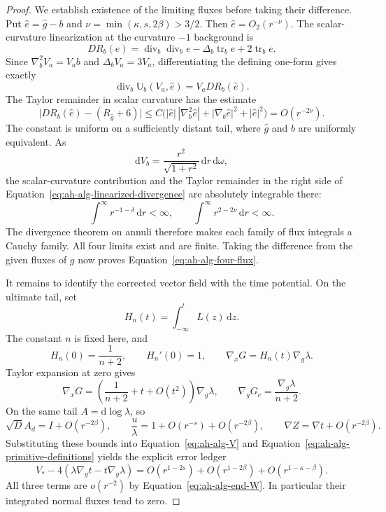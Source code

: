 \begin{proof}
We establish existence of the limiting fluxes before taking their
difference.  Put \(\widehat e=\widehat g-b\) and
\(\nu=\min(\kappa,s,2\beta)>3/2\).  Then
\(\widehat e=O_2(r^{-\nu})\).  The scalar-curvature linearization at
the curvature \(-1\) background is
\[
 D R_b(e)=\operatorname{div}_b\operatorname{div}_b e
           -\Delta_b\operatorname{tr}_b e+2\operatorname{tr}_b e.
\]
Since \(\nabla_b^2V_a=V_a b\) and \(\Delta_bV_a=3V_a\),
differentiating the defining one-form gives exactly
\begin{equation}
 \operatorname{div}_b\mathbb U_b(V_a,\widehat e)
                   =V_a D R_b(\widehat e).
 \label{eq:ah-alg-linearized-divergence}
\end{equation}
The Taylor remainder in scalar curvature has the estimate
\[
 \bigl|D R_b(\widehat e)-(R_{\widehat g}+6)\bigr|
 \le C\bigl(
       |\widehat e|\,|\nabla_b^2\widehat e|
       +|\nabla_b\widehat e|^2+|\widehat e|^2
       \bigr)
 =O(r^{-2\nu}).
\]
The constant is uniform on a sufficiently distant tail, where
\(\widehat g\) and \(b\) are uniformly equivalent.  As
\[
 \mathrm dV_b=\frac{r^2}{\sqrt{1+r^2}}\,\mathrm dr\,\mathrm d\omega,
\]
the scalar-curvature contribution and the Taylor remainder in the
right side of Equation~\eqref{eq:ah-alg-linearized-divergence} are
absolutely integrable there:
\[
 \int^\infty r^{-1-\delta}\,\mathrm dr<\infty,\qquad
 \int^\infty r^{2-2\nu}\,\mathrm dr<\infty .
\]
The divergence theorem on annuli therefore makes each family of
flux integrals a Cauchy family.  All four limits exist and are finite.
Taking the difference from the given fluxes of \(g\) now proves
Equation~\eqref{eq:ah-alg-four-flux}.

It remains to identify the corrected vector field with the time
potential.  On the ultimate tail, set
\[
 H_n(t)=\int_{-\infty}^t L(z)\,\mathrm dz.
\]
The constant \(n\) is fixed here, and
\[
 H_n(0)=\frac1{n+2},\qquad H_n'(0)=1,\qquad
 \nabla_xG=H_n(t)\nabla_g\lambda .
\]
Taylor expansion at zero gives
\[
 \nabla_xG
   =\left(\frac1{n+2}+t+O(t^2)\right)\nabla_g\lambda,\qquad
 \nabla_gG_c=\frac{\nabla_g\lambda}{n+2}.
\]
On the same tail \(A=\mathrm d\log\lambda\), so
\[
 \sqrt D A_d=I+O(r^{-2\beta}),\qquad
 \frac u\lambda=1+O(r^{-s})+O(r^{-2\beta}),\qquad
 \nabla Z=\nabla t+O(r^{-2\beta}).
\]
Substituting these bounds into
Equation~\eqref{eq:ah-alg-V} and
Equation~\eqref{eq:ah-alg-primitive-definitions} yields the explicit
error ledger
\begin{equation}
 V_*-4(\lambda\nabla_gt-t\nabla_g\lambda)
   =O(r^{1-2s})+O(r^{1-2\beta})
                         +O(r^{1-\kappa-\beta}).
 \label{eq:ah-alg-vector-error}
\end{equation}
All three terms are \(o(r^{-2})\) by
Equation~\eqref{eq:ah-alg-end-W}.  In particular their integrated
normal fluxes tend to zero.


\end{proof}

